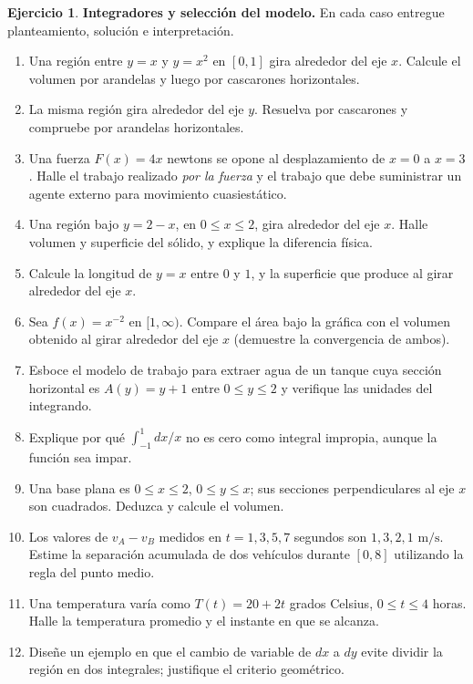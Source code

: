 \documentclass[12pt]{article}
\theoremstyle{definition}
\newtheorem{Ejer}[teorema]{Ejercicio}
\theoremstyle{remark}
\begin{document}
\begin{Ejer}\textbf{Integradores y selección del modelo.} En cada caso entregue planteamiento, solución e interpretación.
\begin{enumerate}[resume=banco3]
\item Una región entre $y=x$ y $y=x^2$ en $[0,1]$ gira alrededor del eje $x$. Calcule el volumen por arandelas y luego por cascarones horizontales.
\item La misma región gira alrededor del eje $y$. Resuelva por cascarones y compruebe por arandelas horizontales.
\item Una fuerza $F(x)=4x$ newtons se opone al desplazamiento de $x=0$ a $x=3$. Halle el trabajo realizado \emph{por la fuerza} y el trabajo que debe suministrar un agente externo para movimiento cuasiestático.
\item Una región bajo $y=2-x$, en $0\le x\le2$, gira alrededor del eje $x$. Halle volumen y superficie del sólido, y explique la diferencia física.
\item Calcule la longitud de $y=x$ entre $0$ y $1$, y la superficie que produce al girar alrededor del eje $x$.
\item Sea $f(x)=x^{-2}$ en $[1,\infty)$. Compare el área bajo la gráfica con el volumen obtenido al girar alrededor del eje $x$ (demuestre la convergencia de ambos).
\item Esboce el modelo de trabajo para extraer agua de un tanque cuya sección horizontal es $A(y)=y+1$ entre $0\le y\le2$ y verifique las unidades del integrando.
\item Explique por qué $\int_{-1}^1dx/x$ no es cero como integral impropia, aunque la función sea impar.
\item Una base plana es $0\le x\le2$, $0\le y\le x$; sus secciones perpendiculares al eje $x$ son cuadrados. Deduzca y calcule el volumen.
\item Los valores de $v_A-v_B$ medidos en $t=1,3,5,7$ segundos son $1,3,2,1$ $\mathrm{m/s}$. Estime la separación acumulada de dos vehículos durante $[0,8]$ utilizando la regla del punto medio.
\item Una temperatura varía como $T(t)=20+2t$ grados Celsius, $0\le t\le4$ horas. Halle la temperatura promedio y el instante en que se alcanza.
\item Diseñe un ejemplo en que el cambio de variable de $dx$ a $dy$ evite dividir la región en dos integrales; justifique el criterio geométrico.
\end{enumerate}
\end{Ejer}
\end{document}
